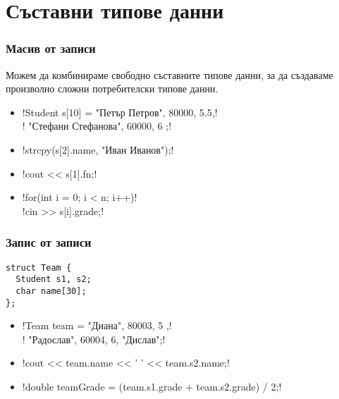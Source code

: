 \documentclass{beamer}
\begin{document}
\section{Съставни типове данни}

\begin{frame}[fragile]
  \frametitle{Масив от записи}

  Можем да комбинираме свободно съставните типове данни, за да създаваме произволно сложни потребителски типове данни.\\
  \pause
  \begin{itemize}[<+->]
  \item \lst!Student s[10] = { { "Петър Петров", 80000, 5.5},!\\
      \hspace{21ex}\lst!{ "Стефани Стефанова", 60000, 6 } };!
  \item \lst!strcpy(s[2].name, "Иван Иванов");!
  \item \lst!cout << s[1].fn;!
  \item \lst!for(int i = 0; i < n; i++)!\\
    \hspace{2ex}\lst!cin >> s[i].grade;!
  \end{itemize}
\end{frame}

\begin{frame}[fragile]
  \frametitle{Запис от записи}

\begin{lstlisting}
struct Team {
  Student s1, s2;
  char name[30];
};
\end{lstlisting}
\pause
  \begin{itemize}[<+->]
  \item \lst!Team team = { { "Диана", 80003, 5 },!\\
      \hspace{16ex}\lst!{ "Радослав", 60004, 6}, "Дислав"};!
  \item \lst!cout << team.name << ' ' << team.s2.name;!
  \item \lst!double teamGrade = (team.s1.grade + team.s2.grade) / 2;!
  \end{itemize}
\end{frame}
\end{document}
